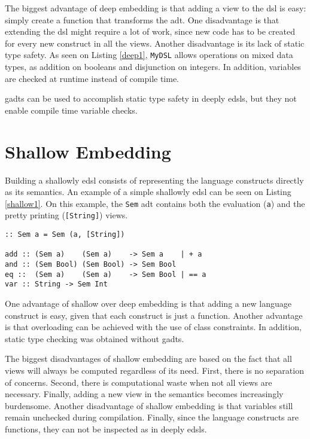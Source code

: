 The biggest advantage of deep embedding is that adding a view to the \ac{dsl} is easy: simply create a function that transforms the \ac{adt}. One disadvantage is that extending the \ac{dsl} might require a lot of work, since new code has to be created for every new construct in all the views. Another disadvantage is its lack of static type safety. As seen on Listing \ref{deep1}, \texttt{MyDSL} allows operations on mixed data types, as addition on booleans and disjunction on integers. In addition, variables are checked at runtime instead of compile time.

\acp{gadt} can be used to accomplish static type safety in deeply \acp{edsl}, but they not enable compile time variable checks. 

\section{Shallow Embedding}
Building a shallowly \ac{edsl} consists of representing the language constructs directly as its semantics. An example of a simple shallowly \ac{edsl} can be seen on Listing \ref{shallow1}. On this example, the \texttt{Sem} \ac{adt} contains both the evaluation (\texttt{a}) and the pretty printing (\texttt{[String]}) views.

\begin{lstlisting}[caption=A simple shallowly \ac{edsl},captionpos=b,label=shallow1]
:: Sem a = Sem (a, [String])

add :: (Sem a)    (Sem a)    -> Sem a    | + a
and :: (Sem Bool) (Sem Bool) -> Sem Bool
eq ::  (Sem a)    (Sem a)    -> Sem Bool | == a
var :: String -> Sem Int
\end{lstlisting}

One advantage of shallow over deep embedding is that adding a new language construct is easy, given that each construct is just a function. Another advantage is that overloading can be achieved with the use of class constraints. In addition, static type checking was obtained without \acp{gadt}. 

The biggest disadvantages of shallow embedding are based on the fact that all views will always be computed regardless of its need. First, there is no separation of concerns. Second, there is computational waste when not all views are necessary. Finally, adding a new view in the semantics becomes increasingly burdensome. Another disadvantage of shallow embedding is that variables still remain unchecked during compilation. Finally, since the language constructs are functions, they can not be inspected as in deeply \acp{edsl}.

